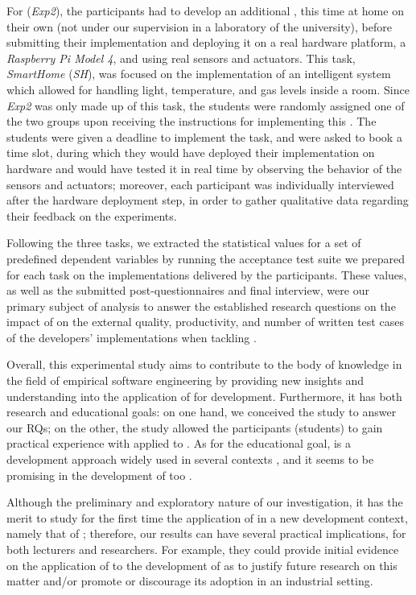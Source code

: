 For (\textit{Exp2}), the participants had to develop an additional \es, this time at home on their own (\ie not under our supervision in a laboratory of the university), before submitting their implementation and deploying it on a real hardware platform, a \textit{Raspberry Pi Model 4}, and using real sensors and actuators. This task, \textit{SmartHome} (\textit{SH}), was focused on the implementation of an intelligent system which allowed for handling light, temperature, and gas levels inside a room.
Since \textit{Exp2} was only made up of this task, the students were randomly assigned one of the two groups upon receiving the instructions for implementing this \es.
The students were given a deadline to implement the task, and were asked to book a time slot, during which they would have deployed their implementation on hardware and would have tested it in real time by observing the behavior of the sensors and actuators; moreover, each participant was individually interviewed after the hardware deployment step, in order to gather qualitative data regarding their feedback on the experiments.

Following the three tasks, we extracted the statistical values for a set of predefined dependent variables by running the acceptance test suite we prepared for each task on the implementations delivered by the participants. These values, as well as the submitted post-questionnaires and final interview, were our primary subject of analysis to answer the established research questions on the impact of \tdd on the external quality, productivity, and number of written test cases of the developers' implementations when tackling \ess.

Overall, this experimental study aims to contribute to the body of knowledge in the field of empirical software engineering by providing new insights and understanding into the application of \tdd for \es development. Furthermore, it has both research and educational goals: on one hand, we conceived the study to answer our RQs; on the other, the study allowed the participants (students) to gain practical experience with \tdd applied to \ess. As for the educational goal, \tdd is a development approach widely used in several contexts \cite{DBLP:conf/esem/RomanoZBPS22}, and it seems to be promising in the development of \ess too \cite{TDDEC}.

Although the preliminary and exploratory nature of our investigation, it has the merit to study for the first time the application of \tdd in a new development context, namely that of \ess; therefore, our results can have several practical implications, for both lecturers and researchers. For example, they could provide initial evidence on the application of \tdd to the development of \ess as to justify future research on this matter and/or promote or discourage its adoption in an industrial setting.


